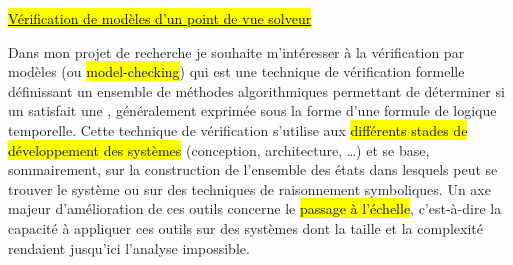 \label{sec:projet_recherche}
\vspace{10pt}

\hl{\underline{Vérification de modèles d’un point de vue solveur}}
\vspace{10pt}



Dans mon projet de recherche je souhaite m'intéresser à la vérification par
modèles (ou \hl{{model-checking}}) qui est une technique de vérification
formelle définissant un ensemble de méthodes algorithmiques permettant de
déterminer si un  satisfait une , généralement exprimée sous la forme d'une formule de logique
temporelle. Cette technique de vérification s'utilise aux \hl{différents stades de
développement des systèmes} (conception, architecture, \dots) et se base,
sommairement, sur la construction de l'ensemble des états dans lesquels peut se
trouver le système ou sur des techniques de raisonnement symboliques. Un axe
majeur d'amélioration de ces outils concerne le \hl{passage à l'échelle},
c'est-à-dire la capacité à appliquer ces outils sur des systèmes dont la taille
et la complexité rendaient jusqu'ici l'analyse impossible.\\

